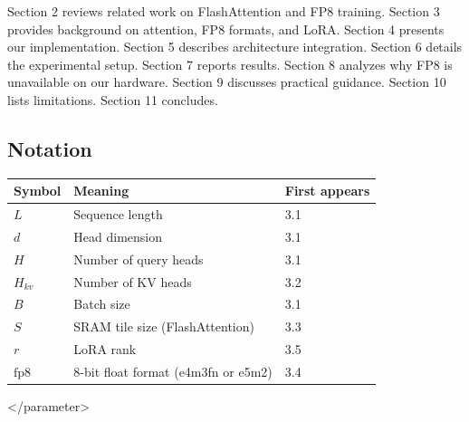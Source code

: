 Section 2 reviews related work on FlashAttention and FP8 training. Section 3 
provides background on attention, FP8 formats, and LoRA. Section 4 presents 
our implementation. Section 5 describes architecture integration. Section 6 
details the experimental setup. Section 7 reports results. Section 8 
analyzes why FP8 is unavailable on our hardware. Section 9 discusses 
practical guidance. Section 10 lists limitations. Section 11 concludes.



\subsection{Notation}

\begin{table}[H]
\centering
\small
\begin{tabular}{lll}
\toprule
\textbf{Symbol} & \textbf{Meaning} & \textbf{First appears} \\
\midrule
$L$ & Sequence length & 3.1 \\
$d$ & Head dimension & 3.1 \\
$H$ & Number of query heads & 3.1 \\
$H_{kv}$ & Number of KV heads & 3.2 \\
$B$ & Batch size & 3.1 \\
$S$ & SRAM tile size (FlashAttention) & 3.3 \\
$r$ & LoRA rank & 3.5 \\
$\text{fp8}$ & 8-bit float format (e4m3fn or e5m2) & 3.4 \\
\bottomrule
\end{tabular}
\end{table}
\textless{}/parameter\textgreater{}

